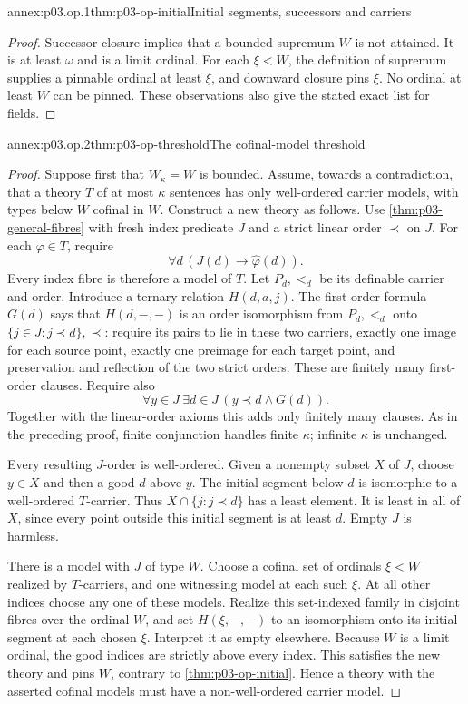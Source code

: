 \begin{annexitem}{annex:p03.op.1}{thm:p03-op-initial}{Initial segments, successors and carriers}
\begin{proof}
Successor closure implies that a bounded supremum \(W\) is
not attained. It is at least \(\omega\) and is a limit ordinal.
For each \(\xi<W\), the definition of supremum supplies a
pinnable ordinal at least \(\xi\), and downward closure pins
\(\xi\). No ordinal at least \(W\) can be pinned. These
observations also give the stated exact list for fields.
\end{proof}
\end{annexitem}

\begin{annexitem}{annex:p03.op.2}{thm:p03-op-threshold}{The cofinal-model threshold}
\begin{proof}
Suppose first that \(W_\kappa=W\) is bounded. Assume, towards
a contradiction, that a theory \(T\) of at most \(\kappa\)
sentences has only well-ordered carrier models, with types below
\(W\) cofinal in \(W\). Construct a new theory as follows.
Use \cref{thm:p03-general-fibres} with fresh index predicate
\(J\) and a strict linear order \(\prec\) on \(J\).
For each \(\varphi\in T\), require
\[
 \forall d\,(J(d)\longrightarrow\widehat\varphi(d)).
\]
Every index fibre is therefore a model of \(T\). Let \(P_d,<_{d}\)
be its definable carrier and order. Introduce a ternary relation
\(H(d,a,j)\). The first-order formula \(G(d)\) says that
\(H(d,-,-)\) is an order isomorphism from \(P_d,<_{d}\) onto
\(\{j\in J:j\prec d\},\prec\): require its pairs to lie in
these two carriers, exactly one image for each source point,
exactly one preimage for each target point, and preservation and
reflection of the two strict orders. These are finitely many
first-order clauses. Require also
\[
 \forall y\in J\ \exists d\in J\,
             (y\prec d\land G(d)).
\]
Together with the linear-order axioms this adds only finitely
many clauses. As in the preceding proof, finite conjunction
handles finite \(\kappa\); infinite \(\kappa\) is unchanged.

Every resulting \(J\)-order is well-ordered. Given a nonempty
subset \(X\) of \(J\), choose \(y\in X\) and then a good
\(d\) above \(y\). The initial segment below \(d\) is
isomorphic to a well-ordered \(T\)-carrier. Thus
\(X\cap\{j:j\prec d\}\) has a least element. It is least
in all of \(X\), since every point outside this initial
segment is at least \(d\). Empty \(J\) is harmless.

There is a model with \(J\) of type \(W\). Choose a cofinal
set of ordinals \(\xi<W\) realized by \(T\)-carriers, and
one witnessing model at each such \(\xi\). At all other
indices choose any one of these models. Realize this set-indexed
family in disjoint fibres over the ordinal \(W\), and set
\(H(\xi,-,-)\) to an isomorphism onto its initial segment
at each chosen \(\xi\). Interpret it as empty elsewhere.
Because \(W\) is a limit ordinal, the good indices are
strictly above every index. This satisfies the new theory and
pins \(W\), contrary to \cref{thm:p03-op-initial}.
Hence a theory with the asserted cofinal models must have a
non-well-ordered carrier model.


\end{proof}
\end{annexitem}
